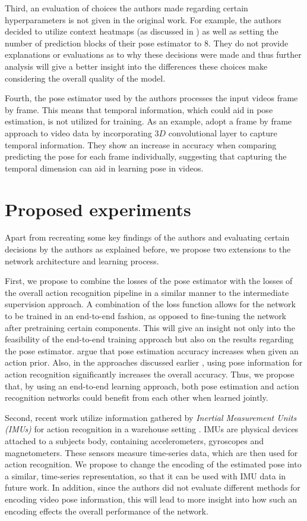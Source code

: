 Third, an evaluation of choices the authors made regarding certain hyperparameters is not given in the original work.
For example, the authors decided to utilize context heatmaps (as discussed in ) as well as setting the number of prediction blocks of their pose estimator to $8$.
They do not provide explanations or evaluations as to why these decisions were made and thus further analysis will give a better insight into the differences these choices make considering the overall quality of the model.

Fourth, the pose estimator used by the authors processes the input videos frame by frame.
This means that temporal information, which could aid in pose estimation, is not utilized for training.
As an example, \cite{girdhar_detect-and-track:_2018} adopt a frame by frame approach to video data by incorporating $3D$ convolutional layer to capture temporal information.
They show an increase in accuracy when comparing predicting the pose for each frame individually, suggesting that capturing the temporal dimension can aid in learning pose in videos.

\section{Proposed experiments}
Apart from recreating some key findings of the authors and evaluating certain decisions by the authors as explained before, we propose two extensions to the network architecture and learning process.

First, we propose to combine the losses of the pose estimator with the losses of the overall action recognition pipeline in a similar manner to the intermediate supervision approach.
A combination of the loss function allows for the network to be trained in an end-to-end fashion, as opposed to fine-tuning the network after pretraining certain components.
This will give an insight not only into the feasibility of the end-to-end training approach but also on the results regarding the pose estimator.
\cite{iqbal_pose_2016} argue that pose estimation accuracy increases when given an action prior.
Also, in the approaches discussed earlier , using pose information for action recognition significantly increases the overall accuracy.
Thus, we propose that, by using an end-to-end learning approach, both pose estimation and action recognition networks could benefit from each other when learned jointly.

Second, recent work utilize information gathered by \textit{Inertial Measurement Units (IMUs)} for action recognition in a warehouse setting \cite{reining_towards_2018}.
IMUs are physical devices attached to a subjects body, containing accelerometers, gyroscopes and magnetometers.
These sensors measure time-series data, which are then used for action recognition.
We propose to change the encoding of the estimated pose into a similar, time-series representation, so that it can be used with IMU data in future work.
In addition, since the authors did not evaluate different methods for encoding video pose information, this will lead to more insight into how such an encoding effects the overall performance of the network.
